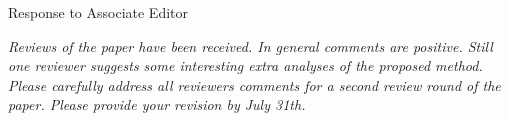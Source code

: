 \newcommand{\rev}[1]{{\noindent {\bf Comment:} {\it #1}}~\\[-2mm]}
\newcommand{\ans}[1]{{\noindent {\bf Response:} #1}~\\[-2mm]}
\newcommand{\td}[1]{{\noindent {\bf TODO:} #1}~\\}



\newcommand{\PM}[1]{
~\\[-4mm]
``{\em #1}''
}


\newpage
{\LARGE \noindent Response to Associate Editor}\newline



\rev{Reviews of the paper have been received. In general comments are positive. Still one reviewer suggests some interesting extra analyses of the proposed method. Please carefully address all reviewers comments for a second review round of the paper. Please provide your revision by July 31th.}

